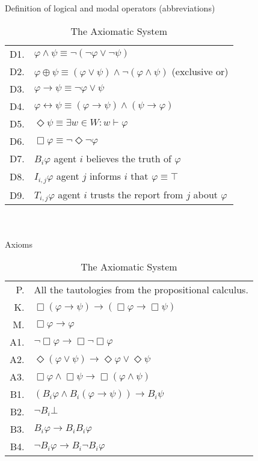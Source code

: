 \begin{table}[!t]
\small
\centering
\caption{The Axiomatic System}
Definition of logical and modal operators (abbreviations) \\
\begin{tabular}{r l}
D1. & $\varphi \wedge \psi \equiv \neg ( \neg \varphi \vee \neg \psi)$\\
D2. & $\varphi \oplus \psi \equiv (\varphi \vee \psi) \wedge \neg(\varphi \wedge \psi)$ (exclusive or)\\
D3. & $\varphi \rightarrow \psi \equiv \neg \varphi \vee \psi $\\
D4. & $\varphi \leftrightarrow \psi \equiv (\varphi \rightarrow \psi) \wedge (\psi \rightarrow \varphi)$\\
D5. & $\Diamond \psi \equiv \exists w \in W : w \vdash \varphi $\\
D6. & $\Box \varphi \equiv \neg \Diamond \neg \varphi $\\
D7. & $B_i \varphi$ agent $i$ believes the truth of $\varphi$\\
D8. & $I_{i,j} \varphi$ agent $j$ informs $i$ that $\varphi \equiv \top$\\
D9. & $T_{i,j} \varphi$ agent $i$ trusts the report from $j$ about $\varphi$ \\
\end{tabular} \\~\\
Axioms \\
\begin{tabular}{r l}
P. & All the tautologies from the propositional calculus.\\
K. & $\Box (\varphi \rightarrow \psi) \rightarrow (\Box \varphi \rightarrow \Box \psi)$\\
M. & $\Box \varphi \rightarrow \varphi$\\
A1. & $\neg \Box \varphi \rightarrow \Box \neg \Box \varphi $\\
A2. & $\Diamond (\varphi \vee \psi) \rightarrow \Diamond \varphi \vee \Diamond \psi $\\
A3. & $\Box \varphi \wedge \Box \psi \rightarrow \Box (\varphi \wedge \psi)$ \\
B1. & $(B_i \varphi \wedge B_i (\varphi \rightarrow \psi )) \rightarrow B_i \psi$ \\
B2. & $\neg B_i \bot$\\
B3. & $B_i \varphi \rightarrow B_i B_i \varphi$ \\
B4. & $\neg B_i \varphi \rightarrow B_i \neg B_i \varphi$\\

\end{tabular}
\end{table}
